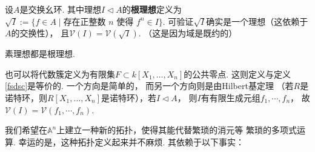     设$A$是交换幺环. 其中理想$I \lhd A$的\textbf{根理想}定义为
    $\sqrt{I}:=\{f \in A \mid \text{存在正整数 }n\text{ 使得 }f^{n} \in I \}$. 
    可验证$\sqrt{I}$确实是一个理想（这依赖于$A$的交换性），
    且$\mathcal{V}(I) = \mathcal{V}(\sqrt{I})$. 
    （这是因为域是既约的）
    
    \begin{example}
    素理想都是根理想.
    \end{example}

    \begin{remark}
        也可以将代数簇定义为有限集$F \subset k[X_{1},\ldots,X_{n}]$的公共零点. 
        这则定义与定义\ref{fsdsc}是等价的. 一个方向是简单的，
        而另一个方向则是由Hilbert基定理
        （若$R$是诺特环，则$R[X_{1},\ldots,X_{n}]$是诺特环），若$I \lhd A$，
        则$I$有有限生成元组$f_{1},\cdots,f_{n}$，
        故$\mathcal{V}(I)=\mathcal{V}(f_{1},\cdots,f_{n})$.    
    \end{remark}

    我们希望在$\mathbb{A}^{n}$上建立一种新的拓扑，使得其能代替繁琐的消元等
    繁琐的多项式运算. 幸运的是，这种拓扑定义起来并不麻烦. 其依赖于以下事实：

